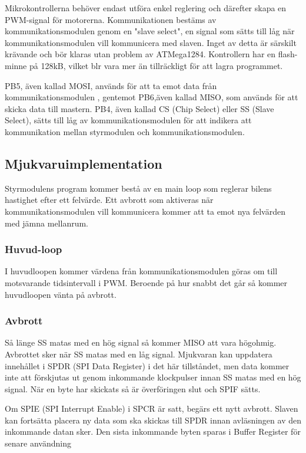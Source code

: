 \documentclass[designspec/spec.tex]{subfiles}
\begin{document}
Mikrokontrollerna behöver endast utföra enkel reglering och därefter skapa en
PWM-signal för motorerna. Kommunikationen bestäms av kommunikationsmodulen
genom en "slave select", en signal som sätts till låg när kommunikationsmodulen
vill kommunicera med slaven.  Inget av detta är särskilt krävande och bör
klaras utan problem av ATMega1284.  Kontrollern har en flash-minne på 128kB,
vilket blr vara mer än tillräckligt för att lagra programmet.

PB5, även kallad MOSI, används för att ta emot data från kommunikationsmodulen
, gentemot PB6,även kallad MISO, som används för att skicka data till mastern.
PB4, även kallad CS (Chip Select) eller SS (Slave Select), sätts till låg av
kommunikationsmodulen för att indikera att kommunikation mellan styrmodulen och
kommunikationsmodulen.

\subsection{Mjukvaruimplementation}
Styrmodulens program kommer bestå av en main loop som reglerar bilens hastighet
efter ett felvärde. Ett avbrott som aktiveras när kommunikationsmodulen vill
kommunicera kommer att ta emot nya felvärden med jämna mellanrum.

\subsubsection{Huvud-loop}
I huvudloopen kommer värdena från kommunikationsmodulen göras om till
motsvarande tidsintervall i PWM. Beroende på hur snabbt det går så kommer
huvudloopen vänta på avbrott.

\subsubsection{Avbrott}
Så länge SS matas med en hög signal så kommer MISO att vara högohmig. Avbrottet
sker när SS matas med en låg signal. Mjukvaran kan uppdatera innehållet i SPDR
(SPI Data Register) i det här tillståndet, men data kommer inte att förskjutas
ut genom inkommande klockpulser innan SS matas med en hög signal. När en byte
har skickats så är överföringen slut och SPIF sätts. 

Om SPIE (SPI Interrupt Enable) i SPCR är satt, begärs ett nytt avbrott. Slaven
kan fortsätta placera ny data som ska skickas till SPDR innan avläsningen av
den inkommande datan sker. Den sista inkommande byten sparas i Buffer Register
för senare användning
\end{document}
